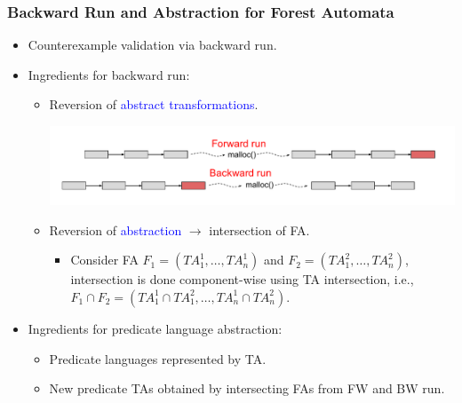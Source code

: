 \documentclass{beamer}
\newcommand{\hlbl}[1]{\textcolor{blue}{#1}}
\newcommand{\hlgr}[1]{\textcolor{olive!50!green}{#1}}
\begin{document}
\begin{frame}
\frametitle{Backward Run and Abstraction for Forest Automata}
		\begin{itemize}
		\item Counterexample validation via backward run.
		\item \hlgr{Ingredients for backward run}:
		\begin{itemize}
			\item Reversion of \hlbl{abstract transformations}.
			\begin{center}
				\includegraphics[scale=0.4]{ex/at.pdf}
			\end{center}
			\pause
			\item Reversion of \hlbl{abstraction} $\rightarrow$ \hlgr{intersection} of FA.
			\begin{itemize}
				\item Consider FA $F_1=(TA_1^1,\ldots,TA_n^1)$ and $F_2=(TA_1^2,\ldots,TA_n^2)$,
					intersection is done \hlgr{component-wise} using TA intersection, i.e.,
					$F_1 \cap F_2 = (TA_1^1 \cap TA_1^2,\ldots,TA_n^1 \cap TA_n^2)$.
			\end{itemize}
		\end{itemize}
		\pause
		\item \hlgr{Ingredients for predicate language abstraction}:
		\begin{itemize}
			\item Predicate languages represented by TA.
			\item New predicate TAs obtained by intersecting FAs from FW and BW run.
		\end{itemize}
	\end{itemize}

\end{frame}

\end{document}

